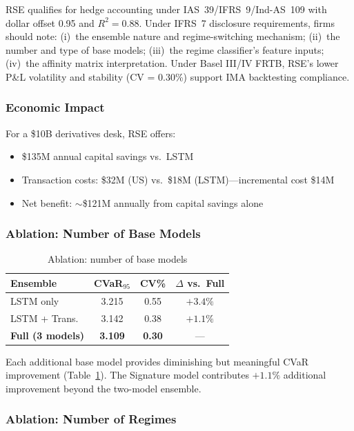 RSE qualifies for hedge accounting under IAS~39/IFRS~9/Ind-AS~109 with dollar offset 0.95 and $R^2 = 0.88$.  Under IFRS~7 disclosure requirements, firms should note: (i)~the ensemble nature and regime-switching mechanism; (ii)~the number and type of base models; (iii)~the regime classifier's feature inputs; (iv)~the affinity matrix interpretation.  Under Basel III/IV FRTB, RSE's lower P\&L volatility and stability (CV = 0.30\%) support IMA backtesting compliance.

\subsubsection{Economic Impact}

For a \$10B derivatives desk, RSE offers:
\begin{itemize}[noitemsep]
    \item \$135M annual capital savings vs.\ LSTM
    \item Transaction costs: \$32M (US) vs.\ \$18M (LSTM)---incremental cost \$14M
    \item Net benefit: $\sim$\$121M annually from capital savings alone
\end{itemize}



\subsubsection{Ablation: Number of Base Models}

\begin{table}[t]
\centering
\caption{Ablation: number of base models}
\label{tab:ablation_models}
\small
\begin{tabular}{lccc}
\toprule
\textbf{Ensemble} & \textbf{CVaR$_{95}$} & \textbf{CV\%} & \textbf{$\Delta$ vs.\ Full} \\
\midrule
LSTM only & 3.215 & 0.55 & $+3.4\%$ \\
LSTM + Trans. & 3.142 & 0.38 & $+1.1\%$ \\
\textbf{Full (3 models)} & \textbf{3.109} & \textbf{0.30} & --- \\
\bottomrule
\end{tabular}
\end{table}

Each additional base model provides diminishing but meaningful CVaR improvement (Table~\ref{tab:ablation_models}). The Signature model contributes $+1.1\%$ additional improvement beyond the two-model ensemble.

\subsubsection{Ablation: Number of Regimes}

